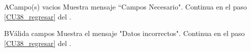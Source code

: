 \begin{UCtrayectoriaA}{A}{Campo(s) vacios}
\UCpaso Muestra mensaje “Campos Necesario".
\UCpaso Continua en el paso \ref{CU38_regresar} del .
\end{UCtrayectoriaA}

\begin{UCtrayectoriaA}{B}{Válida campos}
\UCpaso Muestra el mensaje "Datos incorrectos".
\UCpaso Continua en el paso \ref{CU38_regresar} del .
\end{UCtrayectoriaA}